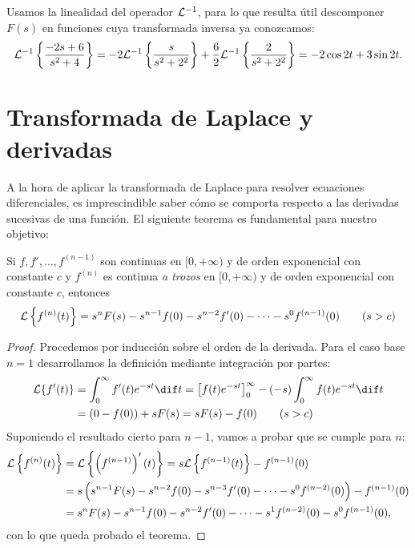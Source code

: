 \documentclass[../ecuaciones_diferenciales.tex]{subfiles}
\begin{document}
\begin{solution}
	Usamos la linealidad del operador \(\mathcal{L}^{-1}\), para lo que resulta útil
	descomponer \(F(s)\) en funciones cuya transformada inversa ya conozcamos:
	\[\mathcal{L}^{-1}\left\{\frac{-2s+6}{s^2+4}\right\} =
		-2\mathcal{L}^{-1}\left\{\frac{s}{s^2+2^2}\right\} +
		\frac{6}{2}\mathcal{L}^{-1}\left\{\frac{2}{s^2+2^2}\right\} = -2 \cos 2t + 3 \sin 2t.\]
\end{solution}

\section{Transformada de Laplace y derivadas}
A la hora de aplicar la transformada de Laplace para resolver ecuaciones
diferenciales, es imprescindible saber cómo se comporta respecto a las derivadas
sucesivas de una función. El siguiente teorema es fundamental para nuestro
objetivo:

\begin{theorem}
	Si \(f, f', \dots, f^{(n-1)}\) son continuas en \([0,+\infty)\) y de orden
	exponencial con constante \(c\) y \(f^{(n)}\) es continua \emph{a trozos} en
	\([0,+\infty)\) y de orden exponencial con constante \(c\), entonces
	\[\mathcal{L}\left\{f^{(n)}(t)\right\} = s^nF(s) - s^{n-1}f(0) - s^{n-2}f'(0) - \cdots -
		s^0f^{(n-1)}(0) \qquad (s>c)\]
	\begin{proof}
		Procedemos por inducción sobre el orden de la derivada. Para el caso base
		\(n=1\) desarrollamos la definición mediante integración por partes:
		\begin{align*}
			\L\{f'(t)\} & = \int_0^\infty f'(t)e^{-st} \dif t =
			\left[f(t)e^{-st}\right]_0^\infty - (-s) \int_0^\infty f(t)e^{-st} \dif t \\
			            & = (0-f(0)) + sF(s) = sF(s) - f(0) \qquad (s > c)
		\end{align*}
		Suponiendo el resultado cierto para \(n-1\), vamos a probar que se cumple
		para \(n\):
		\begin{align*}
			\mathcal{L}\left\{f^{(n)}(t)\right\}
			 & = \mathcal{L}\left\{\left(f^{(n-1)}\right)'(t)\right\}
			= s\mathcal{L}\left\{f^{(n-1)}(t)\right\} - f^{(n-1)}(0)        \\
			 & = s \left( s^{n-1}F(s) - s^{n-2}f(0) - s^{n-3}f'(0)
			- \cdots - s^0f^{(n-2)}(0) \right) - f^{(n-1)}(0)      \\
			 & = s^nF(s) - s^{n-1}f(0) - s^{n-2}f'(0) - \cdots
			- s^1f^{(n-2)}(0) - s^0f^{(n-1)}(0),
		\end{align*}
		con lo que queda probado el teorema.
	\end{proof}
\end{theorem}
\end{document}
